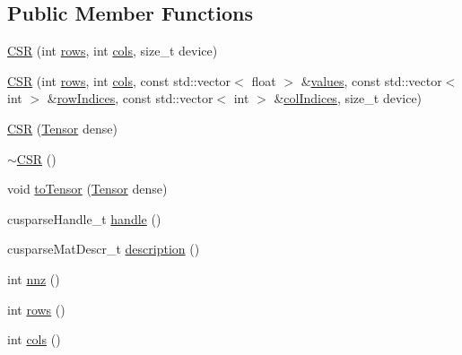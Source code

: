 \subsection*{Public Member Functions}
\begin{DoxyCompactItemize}
\item 
\hyperlink{classmarian_1_1sparse_1_1CSR_a7a2b6f436319f0f5382e10c7709dd2c6}{C\+SR} (int \hyperlink{classmarian_1_1sparse_1_1CSR_a257b7c6a4c057270dace672caecdf69a}{rows}, int \hyperlink{classmarian_1_1sparse_1_1CSR_a2df7ca188de91d079ec9fb3157f5286d}{cols}, size\+\_\+t device)
\item 
\hyperlink{classmarian_1_1sparse_1_1CSR_ac6c38489d34bc7aded9878e9d92c9dce}{C\+SR} (int \hyperlink{classmarian_1_1sparse_1_1CSR_a257b7c6a4c057270dace672caecdf69a}{rows}, int \hyperlink{classmarian_1_1sparse_1_1CSR_a2df7ca188de91d079ec9fb3157f5286d}{cols}, const std\+::vector$<$ float $>$ \&\hyperlink{classmarian_1_1sparse_1_1CSR_af3d51ccd7e843d03db235cc5ec81d366}{values}, const std\+::vector$<$ int $>$ \&\hyperlink{classmarian_1_1sparse_1_1CSR_a2ef5c672f6f31487700cf0b14b2048b4}{row\+Indices}, const std\+::vector$<$ int $>$ \&\hyperlink{classmarian_1_1sparse_1_1CSR_aa85374eab5d0e848ff5af442b8ba2232}{col\+Indices}, size\+\_\+t device)
\item 
\hyperlink{classmarian_1_1sparse_1_1CSR_a5e62d4f84783a6a7fce4a0392225f916}{C\+SR} (\hyperlink{namespacemarian_a88b71ec34bb354564cddc24eb80f7e14}{Tensor} dense)
\item 
\hyperlink{classmarian_1_1sparse_1_1CSR_ac34b367d43aab52753212a9fb801cb65}{$\sim$\+C\+SR} ()
\item 
void \hyperlink{classmarian_1_1sparse_1_1CSR_a10f3b80814d3d694e568255f226e7418}{to\+Tensor} (\hyperlink{namespacemarian_a88b71ec34bb354564cddc24eb80f7e14}{Tensor} dense)
\item 
cusparse\+Handle\+\_\+t \hyperlink{classmarian_1_1sparse_1_1CSR_a25bc1f2b6c9d78e0faf5f0f19f9305e9}{handle} ()
\item 
cusparse\+Mat\+Descr\+\_\+t \hyperlink{classmarian_1_1sparse_1_1CSR_ae4ae60a33b7eb31a15c98427d9d4a4af}{description} ()
\item 
int \hyperlink{classmarian_1_1sparse_1_1CSR_a9b68bf8d20aacba28f927880c2400b52}{nnz} ()
\item 
int \hyperlink{classmarian_1_1sparse_1_1CSR_a257b7c6a4c057270dace672caecdf69a}{rows} ()
\item 
int \hyperlink{classmarian_1_1sparse_1_1CSR_a2df7ca188de91d079ec9fb3157f5286d}{cols} ()
\item 

\end{DoxyCompactItemize}
